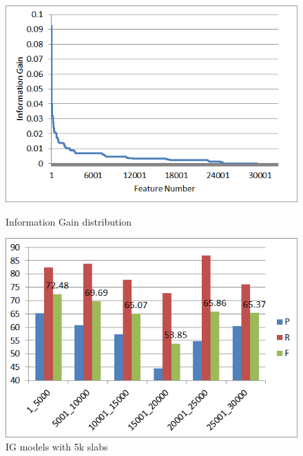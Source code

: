 \begin{figure}
\centering
\begin{minipage}{.5\textwidth}
  \centering
  \includegraphics[width=.95\textwidth]{figures/IGDistr1.png}
  \caption{Information Gain distribution}
  \label{fig:IGDist}
\end{minipage}%
\begin{minipage}{.5\textwidth}
  \centering
  \includegraphics[width=.95\textwidth]{figures/IG5kSlabsComp.png}
  \caption{IG models with 5k slabs}
  \label{fig:IG5kComp}
\end{minipage}
\end{figure} 

